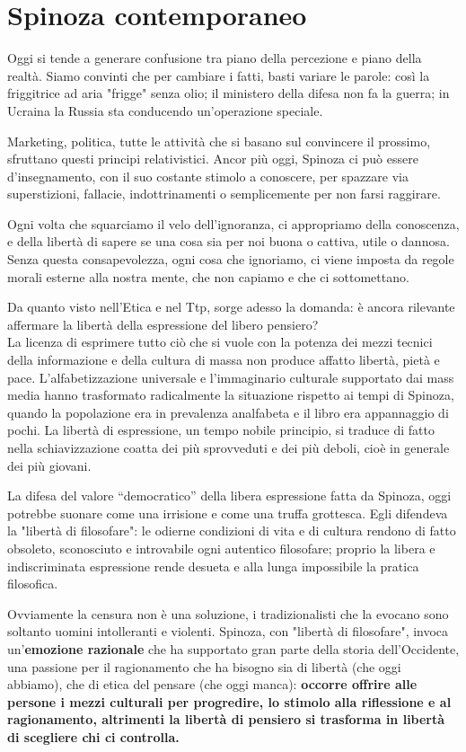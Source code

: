 \chapter{Spinoza contemporaneo}

Oggi si tende a generare confusione tra piano della percezione e piano della realtà. Siamo convinti che per cambiare i fatti, basti variare le parole: così la friggitrice ad aria "frigge" senza olio; il ministero della difesa non fa la guerra; in Ucraina la Russia sta conducendo un'operazione speciale.

Marketing, politica, tutte le attività che si basano sul convincere il prossimo, sfruttano questi principi relativistici. Ancor più oggi, Spinoza ci può essere d'insegnamento, con il suo costante stimolo a conoscere, per spazzare via superstizioni, fallacie, indottrinamenti o semplicemente per non farsi raggirare.

Ogni volta che squarciamo il velo dell'ignoranza, ci appropriamo della conoscenza, e della libertà di sapere se una cosa sia per noi buona o cattiva, utile o dannosa. Senza questa consapevolezza, ogni cosa che ignoriamo, ci viene imposta da regole morali esterne alla nostra mente, che non capiamo e che ci sottomettano.

Da quanto visto nell'Etica e nel Ttp, sorge adesso la domanda: è ancora rilevante affermare la libertà della espressione del libero pensiero? \\
La licenza di
esprimere tutto ciò che si vuole con la potenza dei mezzi tecnici della informazione e della
cultura di massa non produce affatto libertà, pietà e pace. L'alfabetizzazione universale e
l'immaginario culturale supportato dai mass media hanno
trasformato radicalmente la situazione rispetto ai tempi di Spinoza, quando la popolazione era in
prevalenza analfabeta e il libro era appannaggio di pochi. La libertà di espressione, un tempo nobile
principio, si traduce di fatto nella schiavizzazione coatta dei
più sprovveduti e dei più deboli, cioè in generale dei più giovani.

La difesa del valore
“democratico” della libera espressione fatta da Spinoza, oggi potrebbe suonare come una irrisione e come una truffa grottesca. Egli  difendeva la "libertà di filosofare": le
odierne condizioni di vita e di cultura rendono di fatto obsoleto, sconosciuto e introvabile
ogni autentico filosofare; proprio la libera e indiscriminata espressione
rende desueta e alla lunga impossibile la pratica filosofica.

Ovviamente la censura non è una soluzione, i tradizionalisti che la evocano sono soltanto uomini intolleranti e violenti. Spinoza, con "libertà di filosofare", invoca un'\textbf{emozione razionale} che ha supportato gran parte della storia
dell'Occidente, una passione per il ragionamento che ha bisogno sia di libertà (che oggi abbiamo), che di etica del pensare (che oggi manca): \textbf{occorre offrire alle persone i mezzi culturali per progredire, lo stimolo alla riflessione e al ragionamento, altrimenti la libertà di pensiero si trasforma in libertà di scegliere chi ci controlla.}

